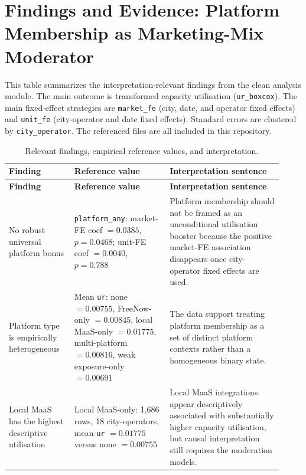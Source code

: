 \documentclass[11pt]{article}
\newcommand{\code}[1]{\texttt{\small #1}}
\begin{document}
\section*{Findings and Evidence: Platform Membership as Marketing-Mix Moderator}

This table summarizes the interpretation-relevant findings from the clean
analysis module. The main outcome is transformed capacity utilisation
(\code{ur\_boxcox}). The main fixed-effect strategies are \code{market\_fe}
(city, date, and operator fixed effects) and \code{unit\_fe}
(city-operator and date fixed effects). Standard errors are clustered by
\code{city\_operator}. The referenced files are all included in this repository.

\begin{landscape}
\small
\begin{longtable}{L{0.22\linewidth} L{0.32\linewidth} L{0.38\linewidth}}
\caption{Relevant findings, empirical reference values, and interpretation.}\\
\toprule
\textbf{Finding} & \textbf{Reference value} & \textbf{Interpretation sentence} \\
\midrule
\endfirsthead
\toprule
\textbf{Finding} & \textbf{Reference value} & \textbf{Interpretation sentence} \\
\midrule
\endhead
\bottomrule
\endfoot

No robust universal platform bonus &
\code{platform\_any}: market-FE coef $=0.0385$, $p=0.0468$; unit-FE coef $=0.0040$, $p=0.788$ &
Platform membership should not be framed as an unconditional utilisation booster because the positive market-FE association disappears once city-operator fixed effects are used. \\

Platform type is empirically heterogeneous &
Mean \code{ur}: none $=0.00755$, FreeNow-only $=0.00845$, local MaaS-only $=0.01775$, multi-platform $=0.00816$, weak exposure-only $=0.00691$ &
The data support treating platform membership as a set of distinct platform contexts rather than a homogeneous binary state. \\

Local MaaS has the highest descriptive utilisation &
Local MaaS-only: 1,686 rows, 18 city-operators, mean \code{ur} $=0.01775$ versus none $=0.00755$ &
Local MaaS integrations appear descriptively associated with substantially higher capacity utilisation, but causal interpretation still requires the moderation models. \\


\end{longtable}
\end{landscape}
\end{document}
